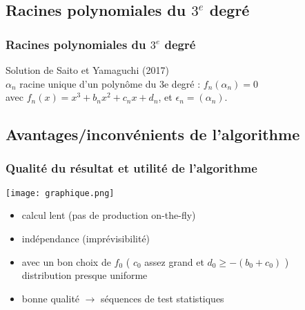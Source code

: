 \subsection{Racines polynomiales du $3^e$ degré}
\begin{frame}
\frametitle{Racines polynomiales du $3^e$ degré}
Solution de Saito et Yamaguchi (2017)\\
\medskip
 $\alpha_n$  racine unique d’un polynôme du 3e degré :  $f_n(\alpha_n) = 0$ \\
 avec $f_n(x) = x^3+b_n x^2+c_n x+d_n$, et $\epsilon_n = (\alpha_n)$. \\
\begin{center}
\end{center}
\end{frame}
\subsection{Avantages/inconvénients de l'algorithme}
\begin{frame}
\frametitle{Qualité du résultat et utilité de l'algorithme}
\begin{center}
\texttt{[image: graphique.png]}\\
\end{center}
\begin{itemize}
 \item 
   calcul lent (pas de production on-the-fly)
 \item<2->  
   indépendance (imprévisibilité)
 \item<3->  
   avec un bon choix de $f_0$ ( $c_0$ assez grand et $d_0\geqslant-(b_0+c_0)$ ) \\
   distribution presque uniforme
 \item<4->
   bonne qualité $\rightarrow$ séquences de test statistiques 
\end{itemize} 
\par \medskip
{} 
\end{frame}

